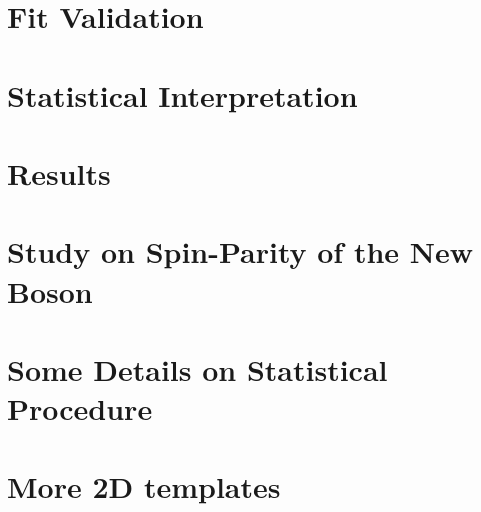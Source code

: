 \documentclass[12pt,chapterheads]{ucsd}
\begin{document}
%
\chapter{Fit Validation}
\label{ch:fit_validation}
%

%
\chapter{Statistical Interpretation}
\label{ch:stat_interpret}
%

%
\chapter{Results}
\label{ch:results}
%

%
\chapter{Study on Spin-Parity of the New Boson}
\label{ch:spin}
%

% 
\newpage



\appendix

%
\chapter{Some Details on Statistical Procedure}
\label{ch:app_stat}
%

%
\chapter{More 2D templates}
\label{ch:app_2dtemplates}
%



 \printindex %
\end{document}
